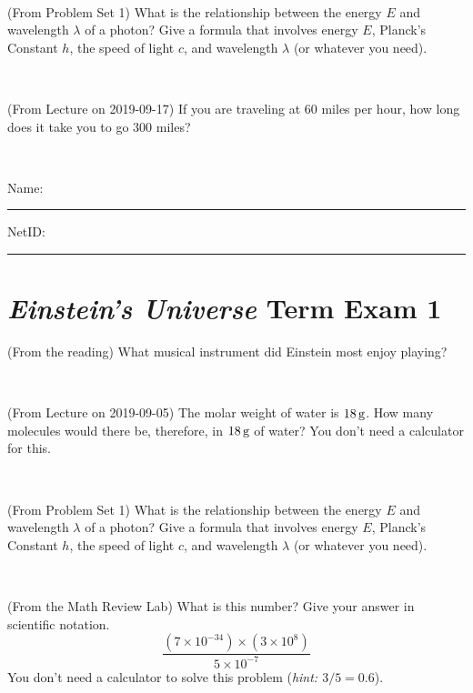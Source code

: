 \documentclass[12pt, letterpaper]{article}
\begin{document}
\vfill ~

\begin{problem} (From Problem Set 1)
What is the relationship between the energy $E$ and wavelength
$\lambda$ of a photon? Give a formula that involves energy $E$,
Planck's Constant $h$, the speed of light $c$, and wavelength
$\lambda$ (or whatever you need).
\end{problem}

\vfill ~

\begin{problem} (From Lecture on 2019-09-17)
If you are traveling at 60 miles per hour, how long does
it take you to go 300 miles?
\end{problem}


\vfill ~


\cleardoublepage



\noindent
Name: \rule[-1ex]{0.60\textwidth}{0.1pt}
NetID: \rule[-1ex]{0.20\textwidth}{0.1pt}

\section*{\textsl{Einstein's Universe} Term Exam 1}
\setcounter{problem}{1}


\begin{problem} (From the reading)
What musical instrument did Einstein most enjoy playing?
\end{problem}


\vfill ~

\begin{problem} (From Lecture on 2019-09-05)
The molar weight of water is $18\,\mathrm{g}$. How many molecules would there
be, therefore, in $18\,\mathrm{g}$ of water? You don't need a calculator for
this.
\end{problem}


\vfill ~

\begin{problem} (From Problem Set 1)
What is the relationship between the energy $E$ and wavelength
$\lambda$ of a photon? Give a formula that involves energy $E$,
Planck's Constant $h$, the speed of light $c$, and wavelength
$\lambda$ (or whatever you need).
\end{problem}

\vfill ~

\begin{problem} (From the Math Review Lab)
What is this number? Give your answer in scientific notation.
$$
\frac{(7\times10^{-34})\times(3\times10^8)}{5\times10^{-7}}
$$
You don't need a calculator to solve this problem (\textit{hint: $3/5=0.6$}).
\end{problem}
\end{document}
